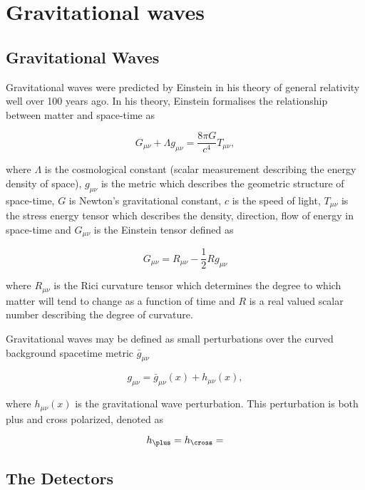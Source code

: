 \chapter{Gravitational waves}

\section{Gravitational Waves}

Gravitational waves were predicted by Einstein in his theory of general relativity well over 100 years ago. In his theory, Einstein formalises the relationship between matter and space-time as

\begin{equation}
    G_{\mu \nu} + \Lambda g_{\mu \nu} = \frac{8 \pi G}{c^{4}} T_{\mu \nu},
\end{equation}{}

where $\Lambda$ is the cosmological constant (scalar measurement describing the energy density of space), $g_{\mu \nu}$ is the metric which describes the geometric structure of space-time, $G$ is Newton's gravitational constant, $c$ is the speed of light, $T_{\mu \nu}$ is the stress energy tensor which describes the density, direction, flow of energy in space-time and $G_{\mu \nu}$ is the Einstein tensor defined as

\begin{equation}
    G_{\mu \nu} = R_{\mu \nu} - \frac{1}{2} R g_{\mu \nu}
\end{equation}

where $R_{\mu \nu}$ is the Rici curvature tensor which determines the degree to which matter will tend to change as a function of time and $R$ is a real valued scalar number describing the degree of curvature. 

Gravitational waves may be defined as small perturbations over the curved background spacetime metric $\bar{g}_{\mu \nu}$

\begin{equation}
    g_{\mu \nu} = \bar{g}_{\mu \nu}(x) + h_{\mu \nu}(x),
\end{equation}{}

where $h_{\mu \nu}(x)$ is the gravitational wave perturbation. This perturbation is both plus and cross polarized, denoted as

\begin{equation}
    h_{\plus} = 
    h_{\cross} = 
\end{equation}{}

\section{The Detectors}

